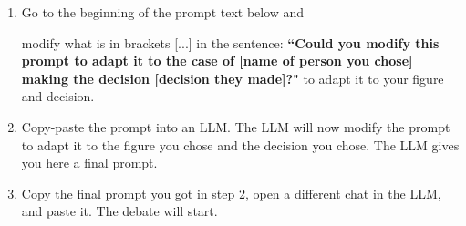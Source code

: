 \documentclass[12pt]{article}
\begin{document}
\begin{enumerate}
    \item Go to the beginning of the prompt text below and 
    
    \colorbox{orange!30}{modify what is in brackets [...] in the sentence:} \textbf{``Could you modify this prompt to adapt it to the case of [name of person you chose] making the decision [decision they made]?"} to adapt it to your figure and decision.

    \item Copy-paste the prompt into an LLM. The LLM will now modify the prompt to adapt it to the figure you chose and the decision you chose. The LLM gives you here a final prompt.

    \item Copy the final prompt you got in step 2, open a \colorbox{orange!30}{different chat} in the LLM, and paste it. The debate will start.

\end{enumerate}
\end{document}
